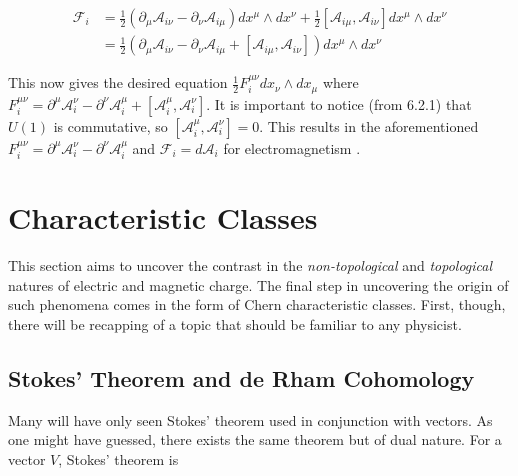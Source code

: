 \documentclass[fleqn, twocolumn, 10pt]{article}
\begin{document}
\begin{ceqn}
\begin{align*}
\mathcal{F}_i &= \frac{1}{2}(\partial_\mu\mathcal{A}_{i\nu} - \partial_\nu\mathcal{A}_{i\mu})dx^\mu\land dx^\nu + \frac{1}{2}[\mathcal{A}_{i\mu}, \mathcal{A}_{i\nu}]dx^\mu\land dx^\nu\\
&=  \frac{1}{2}(\partial_\mu\mathcal{A}_{i\nu} - \partial_\nu\mathcal{A}_{i\mu} + [\mathcal{A}_{i\mu}, \mathcal{A}_{i\nu}])dx^\mu\land dx^\nu
\end{align*}
\end{ceqn}
This now gives the desired equation $\frac{1}{2}F^{\mu\nu}_i dx_\nu \land dx_\mu$ where $F^{\mu\nu}_i = \partial^\mu\mathcal{A}^\nu_{i} - \partial^\nu\mathcal{A}^\mu_{i} + [\mathcal{A}^\mu_{i}, \mathcal{A}^\nu_{i}]$. It is important to notice (from 6.2.1) that $U(1)$ is commutative, so $[\mathcal{A}^\mu_{i}, \mathcal{A}^\nu_{i}] = 0$. This results in the aforementioned $F^{\mu\nu}_i = \partial^\mu\mathcal{A}^\nu_{i} - \partial^\nu\mathcal{A}^\mu_{i}$ and $\mathcal{F}_i = d\mathcal{A}_i$ for electromagnetism \cite{nakahara2003geometry, naber1997topology, schuller2014geometric, mazzoni2017bundles, rupert2008dynamics, atiyah2014geometry}.





\section{Characteristic Classes}

This section aims to uncover the contrast in the \textit{non-topological} and \textit{topological} natures of electric and magnetic charge. The final step in uncovering the origin of such phenomena comes in the form of Chern characteristic classes. First, though, there will be recapping of a topic that should be familiar to any physicist.

\subsection{Stokes' Theorem and de Rham Cohomology}

Many will have only seen Stokes' theorem used in conjunction with vectors. As one might have guessed, there exists the same theorem but of dual nature. For a vector $V$, Stokes' theorem is
\end{document}
